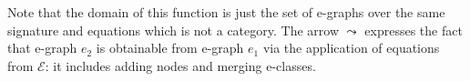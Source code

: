 Note that the domain of this function is just the set of e-graphs over the same signature and equations which is not a category.
The arrow $\leadsto$ expresses the fact that e-graph $e_2$ is obtainable from e-graph $e_1$ via the application of equations from $\mathcal{E}$: it includes adding nodes and merging e-classes.
